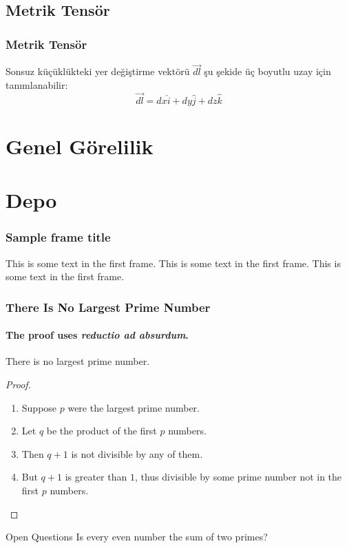 \documentclass{beamer}
\begin{document}
    \subsection{Metrik Tensör}
    \begin{frame}
        \frametitle{Metrik Tensör}
        
        Sonsuz küçüklükteki yer değiştirme vektörü \(\vec{dl}\) şu şekide üç boyutlu uzay için tanımlanabilir: 
        \begin{equation*}
            \vec{dl} = dx\hat{i} + dy\hat{j} + dz\hat{k}
        \end{equation*}
        
    \end{frame}



\section{Genel Görelilik}






\section{Depo}
\begin{frame}
    \frametitle{Sample frame title}
    
    This is some text in the first frame. This is some text in the first frame. This is some text in the first frame.
\end{frame}

\begin{frame}
    \frametitle{There Is No Largest Prime Number}
    \framesubtitle{The proof uses \textit{reductio ad absurdum}.}
    \begin{theorem}
    There is no largest prime number.
    \end{theorem}
    \begin{proof}
    \begin{enumerate}
    \item<1-> Suppose $p$ were the largest prime number.
    \item<2-> Let $q$ be the product of the first $p$ numbers.
    \item<3-> Then $q + 1$ is not divisible by any of them.
    \item<1-> But $q + 1$ is greater than $1$, thus divisible by some prime
    number not in the first $p$ numbers.\qedhere
    \end{enumerate}
    \end{proof}
    \begin{block}{Open Questions}
        Is every even number the sum of two primes?
        \cite{Goldbach1742}
    \end{block}
\end{frame}
\end{document}
